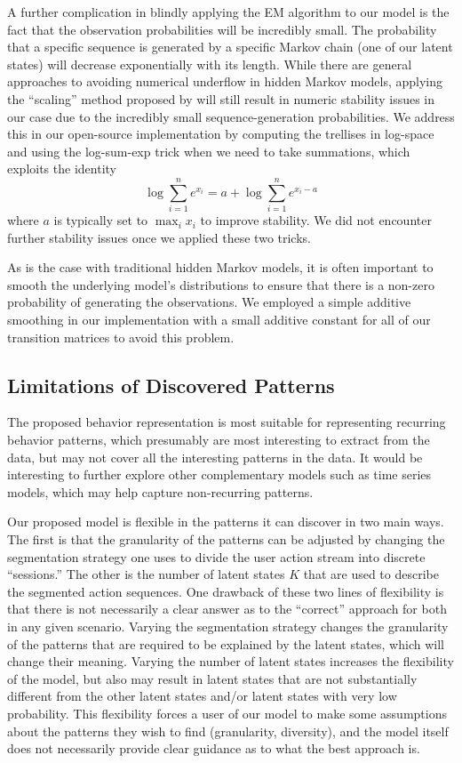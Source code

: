 A further complication in blindly applying the EM algorithm to our model is
the fact that the observation probabilities will be incredibly small. The
probability that a specific sequence is generated by a specific Markov
chain (one of our latent states) will decrease exponentially with its
length. While there are general approaches to avoiding numerical underflow
in hidden Markov models, applying the ``scaling'' method proposed by
\citet{Rabiner:1990:RSR} will still result in numeric stability issues in
our case due to the incredibly small sequence-generation probabilities. We
address this in our open-source implementation by computing the trellises
in log-space and using the log-sum-exp trick when we need to take
summations, which exploits the identity
\begin{equation}
    \log \sum_{i=1}^n e^{x_i} = a + \log \sum_{i=1}^n e^{x_i - a}
\end{equation}
where $a$ is typically set to $\max_i x_i$ to improve stability. We did not
encounter further stability issues once we applied these two tricks.

As is the case with traditional hidden Markov models, it is often important
to smooth the underlying model's distributions to ensure that there is a
non-zero probability of generating the observations. We employed a simple
additive smoothing in our implementation with a small additive constant for
all of our transition matrices to avoid this problem.

\subsection{Limitations of Discovered Patterns}

The proposed behavior representation is most suitable for representing
recurring behavior patterns, which presumably are most interesting to
extract from the data, but may not cover all the interesting patterns in
the data. It would be interesting to further explore other complementary
models such as time series models, which may help capture non-recurring
patterns.

Our proposed model is flexible in the patterns it can discover in two main
ways. The first is that the granularity of the patterns can be adjusted by
changing the segmentation strategy one uses to divide the user action
stream into discrete ``sessions.'' The other is the number of latent
states $K$ that are used to describe the segmented action sequences. One
drawback of these two lines of flexibility is that there is not necessarily
a clear answer as to the ``correct'' approach for both in any given
scenario. Varying the segmentation strategy changes the granularity of the
patterns that are required to be explained by the latent states, which will
change their meaning. Varying the number of latent states increases the
flexibility of the model, but also may result in latent states that are not
substantially different from the other latent states and/or latent states
with very low probability. This flexibility forces a user of our model to
make some assumptions about the patterns they wish to find (granularity,
diversity), and the model itself does not necessarily provide clear
guidance as to what the best approach is.

